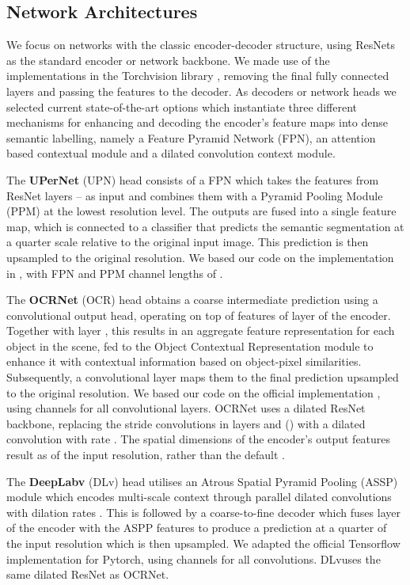 \documentclass[runningheads]{llncs}
\newcommand{\dvp}{DLv}
\newcommand{\upr}{UPN}
\newcommand{\tbf}[1]{\textbf{#1}}
\begin{document}
\subsection{Network Architectures}\label{methods:architectures}
We focus on networks with the classic encoder-decoder structure, using ResNets \cite{ResNet} as the standard encoder or network backbone. We made use of the implementations in the Torchvision library \cite{torchvision}, removing the final fully connected layers and passing the features to the decoder. As decoders or network heads we selected current state-of-the-art options which instantiate three different mechanisms for enhancing and decoding the encoder's feature maps into dense semantic labelling, namely a Feature Pyramid Network (FPN), an attention based contextual module and a dilated convolution context module.

The \tbf{UPerNet} (\upr{}) head \cite{UPerNet} consists of a FPN which takes the features from ResNet layers -- as input and combines them with a Pyramid Pooling Module (PPM) at the lowest resolution level. The outputs are fused into a single feature map, which is connected to a classifier that predicts the semantic segmentation at a quarter scale relative to the original input image. This prediction is then upsampled to the original resolution. We based our code on the implementation in \cite{zhou2017scene,zhou2018semantic}, with FPN and PPM channel lengths of .

The \tbf{OCRNet} (OCR) head \cite{OCR} obtains a coarse intermediate prediction using a convolutional output head, operating on top of features of layer  of the encoder. Together with layer , this results in an aggregate feature representation for each object in the scene, fed to the Object Contextual Representation module to enhance it with contextual information based on object-pixel similarities. Subsequently, a convolutional layer maps them to the final prediction upsampled to the original resolution. We based our code on the official implementation \cite{OCR}, using  channels for all convolutional layers. OCRNet uses a dilated ResNet backbone, replacing the stride  convolutions in layers  and  (\cite{ResNet}) with a dilated convolution with rate . The spatial dimensions of the encoder's output features result as  of the input resolution, rather than the default .

The \tbf{DeepLabv} (\dvp{}) head \cite{Deeplabv3plus} utilises an Atrous Spatial Pyramid Pooling (ASSP) module which encodes multi-scale context through  parallel dilated convolutions with dilation rates . This is followed by a coarse-to-fine decoder which fuses layer  of the encoder with the ASPP features to produce a prediction at a quarter of the input resolution which is then upsampled. We adapted the official Tensorflow implementation \cite{Deeplabv3plus} for Pytorch, using  channels for all convolutions. \dvp uses the same dilated ResNet as OCRNet.
\end{document}
